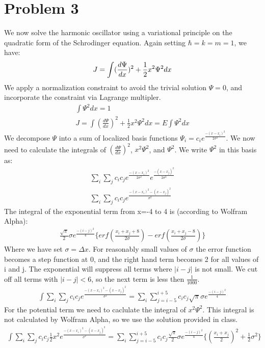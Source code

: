 \documentclass[a4paper,10pt]{article}
\numberwithin{equation}{section}
\begin{document}
\section{Problem 3}
We now solve the harmonic oscillator using a variational principle on the quadratic form of the Schrodinger equation.
Again setting $\hbar =k=m=1$, we have:
\begin{equation}
J=\int (\frac{d\Psi }{dx})^{2}+\frac{1}{2}x^2\Psi ^2 dx\\
\end{equation}
We apply a normalization constraint to avoid the trivial solution $\Psi=0$, and incorporate the constraint via Lagrange multipler.
\begin{gather}
\int \Psi^2 dx = 1\\
J=\int (\frac{d\Psi }{dx})^{2}+\frac{1}{2}x^2\Psi ^2 dx = E\int \Psi^2 dx
\end{gather}
We decompose $\Psi$ into a sum of localized basis functions $\Psi_i=c_ie^{\frac{-(x-x_i)^2}{2\sigma ^2}}$.
We now need to calculate the integrals of $(\frac{d\Psi }{dx})^{2}$, $x^2\Psi ^2$, and $\Psi^2$.
We write $\Psi^2$ in this basis as:
\begin{gather}
 \sum_{i}\sum_{j}c_ic_je^{\frac{-(x-x_i)^2}{2\sigma ^2}}e^{\frac{-(x-x_j)^2}{2\sigma ^2}}\\
 \sum_{i}\sum_{j}c_ic_je^{\frac{-(x-x_i)^2-(x-x_j)^2}{\sigma ^2}}
\end{gather}
The integral of the exponential term from x=-4 to 4 is (according to Wolfram Alpha):
\begin{gather}
\frac{\sqrt{\pi}}{2}\sigma e^{\frac{-(i-j)^2}{4}}\{erf(\frac{x_i+x_j+8}{2\sigma})-erf(\frac{x_i+x_j-8}{2\sigma})\}
\end{gather}
Where we have set $\sigma =\Delta x$. 
For reasonably small values of $\sigma$ the error function becomes a step function at 0, and the right hand term becomes 2 for all values of i and j.
The  exponential will suppress all terms where $|i-j|$ is not small. We cut off all terms with  $|i-j|<6$, so the next term is less then $\frac{1}{1000}$.
\begin{gather}
 \int  \sum_{i}\sum_{j}c_ic_je^{\frac{-(x-x_i)^2-(x-x_j)^2}{\sigma ^2}}=
 \sum_{i}\sum_{j=i-5}^{i+5}c_ic_j\sqrt{\pi}\sigma e^{\frac{-(i-j)^2}{4}}
\end{gather}
For the potential term we need to caclulate the integral of $x^2\Psi ^2$. 
This integral is not calculated by Wolfram Alpha, so we use the solution provided in class.
\begin{gather}
  \int  \sum_{i}\sum_{j}c_ic_j\frac{1}{2}x^{2}e^{\frac{-(x-x_i)^2-(x-x_j)^2}{\sigma ^2}}=
 \sum_{i}\sum_{j=i-5}^{i+5}c_ic_j\frac{\sqrt{\pi}}{2}\sigma e^{\frac{-(i-j)^2}{4}}\{ (\frac{x_i+x_j}{2})^2+\frac{1}{2}\sigma ^2\}
\end{gather}
\end{document}
